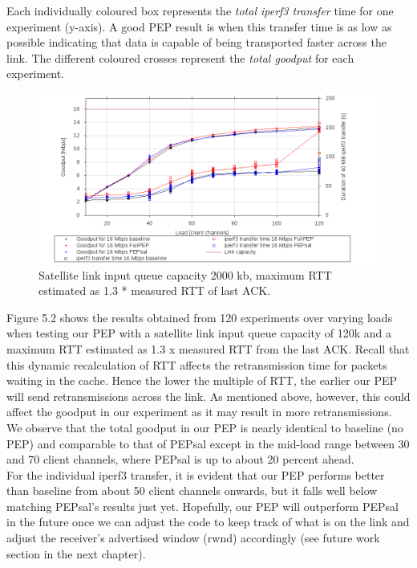 Each individually coloured box represents the \emph{total iperf3 transfer} time for one experiment (y-axis). A good PEP result is when this transfer time is as low as possible indicating that data is capable of being transported faster across the link. The different coloured crosses represent the \emph{total goodput} for each experiment.\\

\begin{figure}[ht!]
    \centering
    \includegraphics[width=1.3\textwidth, angle =270]{2000k.png}
    \caption{Satellite link input queue capacity 2000 kb, maximum RTT estimated as 1.3 * measured RTT of last ACK.}
    \label{fig: 2000k} 
\end{figure}

Figure 5.2 shows the results obtained from 120 experiments over varying loads when testing our PEP with a satellite link input queue capacity of 120k and a maximum RTT estimated as 1.3 x measured RTT from the last ACK. Recall that this dynamic recalculation of RTT affects the retransmission time for packets waiting in the cache. Hence the lower the multiple of RTT, the earlier our PEP will send retransmissions across the link. As mentioned above, however, this could affect the goodput in our experiment as it may result in more retransmissions.\\

We observe that the total goodput in our PEP is nearly identical to baseline (no PEP) and comparable to that of PEPsal except in the mid-load range between 30 and 70 client channels, where PEPsal is up to about 20 percent ahead.\\

For the individual iperf3 transfer, it is evident that our PEP performs better than baseline from about 50 client channels onwards, but it falls well below matching PEPsal's results just yet. Hopefully, our PEP will outperform PEPsal in the future once we can adjust the code to keep track of what is on the link and adjust the receiver's advertised window (rwnd) accordingly (see future work section in the next chapter).\\

